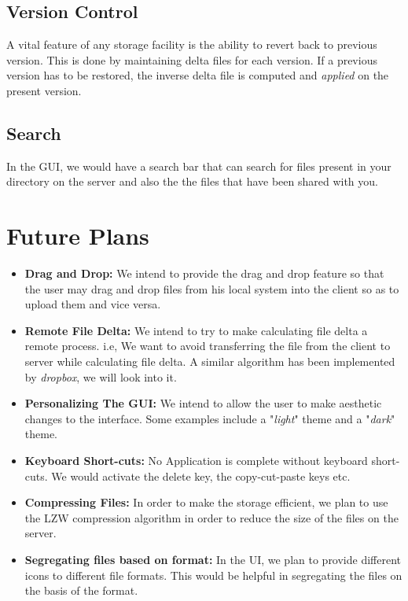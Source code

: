 \documentclass[]{article}
\begin{document}
\subsection{Version Control}
A vital feature of any storage facility is the ability to revert back to previous version. This is done by maintaining delta files for each version. If a previous version has to be restored, the inverse delta file is computed and \textit{applied} on the present version. 

\subsection{Search}
In the GUI, we would have a search bar that can search for files present in your directory on the server and also the the files that have been shared with you.

\section{Future Plans}

\begin{itemize}
\item \textbf{Drag and Drop:} 
We intend to provide the drag and drop feature so that the user may drag and drop files from his local system into the client so as to upload them and vice versa.
\item \textbf{Remote File Delta:}
We intend to try to make calculating file delta a remote process. i.e, We want to avoid transferring the file from the client to server while calculating file delta. A similar algorithm has been implemented by \textit{dropbox}, we will look into it.
\item \textbf{Personalizing The GUI:}
We intend to allow the user to make aesthetic changes to the interface. Some examples include a "\textit{light}" theme and a "\textit{dark}" theme.
\item \textbf{Keyboard Short-cuts:}
No Application is complete without keyboard short-cuts. We would activate the delete key, the copy-cut-paste keys etc.
\item \textbf{Compressing Files:}
In order to make the storage efficient, we plan to use the LZW compression algorithm in order to reduce the size of the files on the server.
\item \textbf{Segregating files based on format:}
In the UI, we plan to provide different icons to different file formats. This would be helpful in segregating the files on the basis of the format. 
\end{itemize}
\end{document}
